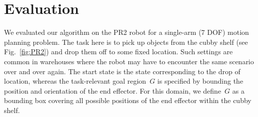 \documentclass[letterpaper]{article} %
\newcommand{\update}[1]{{\color{magenta}#1}}  %
\begin{document}
\section{Evaluation}
\label{sec:eval}
\begin{table}[t]
    \caption{Experimental results comparing our method with other single- and multi-query planners. The table shows the mean/worst-case planning times, success rates and memory usage for our method and for other multi-query planners preprocessed with equal, double and quadruple the time that our method takes in precomputation (T = 1,569 seconds). Note that the worst-case time for our method shown in these results ($\sim$1 millisecond) is the empirical one and not the computed provable time bound which is 3 milliseconds for this environment.
    Results of sampling-based planners are averaged over \update{XXX} trials}
    \label{tab:stats}
\end{table}

We evaluated our algorithm on the PR2 robot for a single-arm (7 DOF) motion planning problem. The task here is to pick up objects from the cubby shelf (see Fig.~\ref{fig:PR2}) and drop them off to some fixed location. Such settings are common in warehouses where the robot may have to encounter the same scenario over and over again. The start state is the state corresponding to the drop of location, whereas the task-relevant goal region~$G$ is specified by bounding the position and orientation of the end effector. For this domain, we define~$G$ as a bounding box covering all possible positions of the end effector within the cubby shelf.
\end{document}
